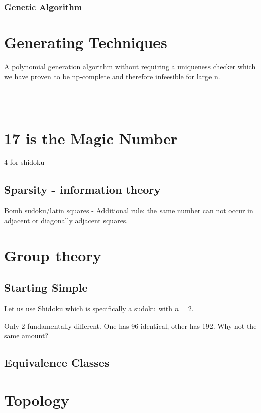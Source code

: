 \documentclass[a4paper,12pt]{article}
\begin{document}
		\subsubsection{Genetic Algorithm}
\section{Generating  Techniques}

	A polynomial generation algorithm without requiring a uniqueness checker which we have proven to be np-complete and therefore infeesible for large n.

~~~~~~~~~~~~~~~~~~~~~~~~~~~~~~~~~~~~~~~~~~~~~~~~~~~~~~~~~~~~~~~~~~~~~~~~~~~~~~ %
\section{17 is the Magic Number}

	4 for shidoku
	\subsection{Sparsity - information theory}
		Bomb sudoku/latin squares - Additional rule: the same number can not occur in adjacent or diagonally adjacent squares.
		
\section{Group theory}
	\subsection{Starting Simple}
		Let us use Shidoku which is specifically a sudoku with $n=2$.

		Only 2 fundamentally different.
		One has 96 identical, other has 192. Why not the same amount?
		
	\subsection{Equivalence Classes}
	
\section{Topology}
\end{document}
